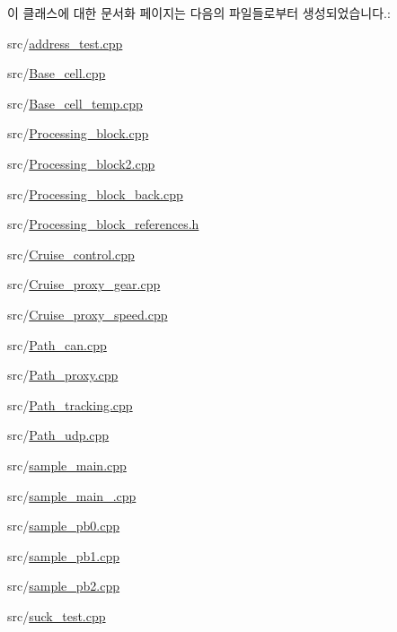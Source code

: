 이 클래스에 대한 문서화 페이지는 다음의 파일들로부터 생성되었습니다.\+:\begin{DoxyCompactItemize}
\item 
src/\hyperlink{address__test_8cpp}{address\+\_\+test.\+cpp}\item 
src/\hyperlink{Base__cell_8cpp}{Base\+\_\+cell.\+cpp}\item 
src/\hyperlink{Base__cell__temp_8cpp}{Base\+\_\+cell\+\_\+temp.\+cpp}\item 
src/\hyperlink{Processing__block_8cpp}{Processing\+\_\+block.\+cpp}\item 
src/\hyperlink{Processing__block2_8cpp}{Processing\+\_\+block2.\+cpp}\item 
src/\hyperlink{Processing__block__back_8cpp}{Processing\+\_\+block\+\_\+back.\+cpp}\item 
src/\hyperlink{Processing__block__references_8h}{Processing\+\_\+block\+\_\+references.\+h}\item 
src/\hyperlink{Cruise__control_8cpp}{Cruise\+\_\+control.\+cpp}\item 
src/\hyperlink{Cruise__proxy__gear_8cpp}{Cruise\+\_\+proxy\+\_\+gear.\+cpp}\item 
src/\hyperlink{Cruise__proxy__speed_8cpp}{Cruise\+\_\+proxy\+\_\+speed.\+cpp}\item 
src/\hyperlink{Path__can_8cpp}{Path\+\_\+can.\+cpp}\item 
src/\hyperlink{Path__proxy_8cpp}{Path\+\_\+proxy.\+cpp}\item 
src/\hyperlink{Path__tracking_8cpp}{Path\+\_\+tracking.\+cpp}\item 
src/\hyperlink{Path__udp_8cpp}{Path\+\_\+udp.\+cpp}\item 
src/\hyperlink{sample__main_8cpp}{sample\+\_\+main.\+cpp}\item 
src/\hyperlink{sample__main__2_8cpp}{sample\+\_\+main\+\_.\+cpp}\item 
src/\hyperlink{sample__pb0_8cpp}{sample\+\_\+pb0.\+cpp}\item 
src/\hyperlink{sample__pb1_8cpp}{sample\+\_\+pb1.\+cpp}\item 
src/\hyperlink{sample__pb2_8cpp}{sample\+\_\+pb2.\+cpp}\item 
src/\hyperlink{suck__test_8cpp}{suck\+\_\+test.\+cpp}\end{DoxyCompactItemize}
